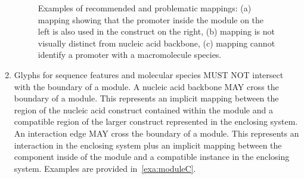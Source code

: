 \begin{enumerate}
	\begin{figure}[h!]
	\centering
	\caption{Examples of recommended and problematic mappings: (a) mapping showing that the promoter inside the module on the left is also used in the construct on the right, (b) mapping is not visually distinct from nucleic acid backbone, (c) mapping cannot identify a promoter with a macromolecule species.}
	\label{exa:moduleB}
	\end{figure}

\item Glyphs for sequence features and molecular species MUST NOT intersect with the boundary of a module.
	A nucleic acid backbone MAY cross the boundary of a module. This represents an implicit mapping between the region of the nucleic acid construct contained within the module and a compatible region of the larger construct represented in the enclosing system.
	An interaction edge MAY cross the boundary of a module. This represents an interaction in the enclosing system plus an implicit mapping between the component inside of the module and a compatible instance in the enclosing system.
	Examples are provided in~\ref{exa:moduleC}.


\end{enumerate}
